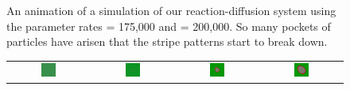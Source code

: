 \begin{figure}[h]
\begin{tabular}{c c c c}
\end{tabular}
\caption{An animation of a simulation of our reaction-diffusion system using the parameter rates  = 175,000 and  = 200,000. So many pockets of  particles have arisen that the stripe patterns start to break down.}
\label{fig:k=200000_f=175000}
\end{figure}

\begin{figure}[h]
\centering
\mySfFamily
\begin{tabular}{c c c c}
\includegraphics[width = 0.19\textwidth]{../images/predator_prey_11_by_11_f_1_k_1} & \includegraphics[width = 0.19\textwidth]{../images/../images/predator_prey_11_by_11_f_1_k_1_i1} & \includegraphics[width = 0.19\textwidth]{../images/../images/predator_prey_11_by_11_f_1_k_1_i2} & \includegraphics[width = 0.19\textwidth]{../images/../images/predator_prey_11_by_11_f_1_k_1_i3}\\[2ex]

\end{tabular}
\end{figure}
